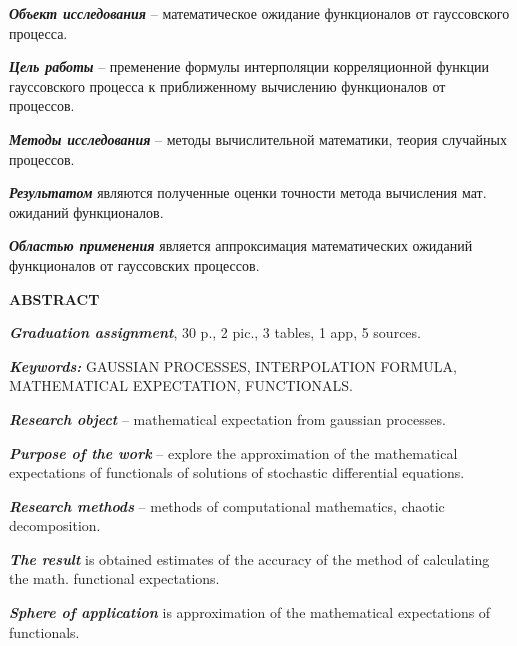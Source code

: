 \documentclass [a4paper, 12pt]{report}
\begin{document}
\emph{\textbf{Объект исследования}} -- математическое ожидание функционалов от гауссовского процесса.

\emph{\textbf{Цель работы}} -- пременение формулы интерполяции корреляционной функции гауссовского процесса к приближенному вычислению функционалов от процессов.

\emph{\textbf{Методы исследования}} -- методы вычислительной математики, теория случайных процессов.

\emph{\textbf{Результатом}} являются полученные оценки точности метода вычисления мат. ожиданий функционалов.

\emph{\textbf{Областью применения}} является аппроксимация математических ожиданий функционалов от гауссовских процессов.

\bigskip
\bigskip

\begin{center}
	\textbf{ABSTRACT}
\end{center}

\emph{\textbf{Graduation assignment}}, 30 p., 2 pic., 3 tables, 1 app, 5 sources.

\emph{\textbf{Keywords:}} GAUSSIAN PROCESSES, INTERPOLATION FORMULA,\\ MATHEMATICAL EXPECTATION, FUNCTIONALS.

\emph{\textbf{Research object}} -- mathematical expectation from gaussian processes.

\emph{\textbf{Purpose of the work}} -- explore the approximation of the mathematical expectations of functionals of solutions of stochastic differential equations.

\emph{\textbf{Research methods}} -- methods of computational mathematics, chaotic decomposition.

\emph{\textbf{The result}} is obtained estimates of the accuracy of the method of calculating the math. functional expectations.

\emph{\textbf{Sphere of application }}is approximation of the mathematical expectations of functionals.
\end{document}
